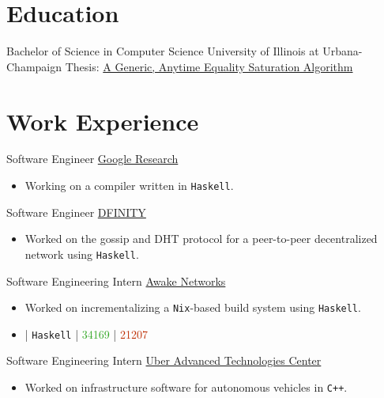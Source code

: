\documentclass[10pt,letterpaper,sans]{moderncv}
\newcommand{\wlink}[2]{\textcolor[HTML]{0020B6}{\href{#1}{#2}}}
\newcommand{\ghlink}[2]{\wlink{https://github.com/#1}{#2}}
\newcommand{\ghrepo}[1]{\ghlink{#1}{\faGithub}}
\newcommand{\ghlang}[1]{\texttt{#1}}
\newcommand{\ghadd}[1]{\textcolor[HTML]{30A622}{{\faPlusCircle} #1}}
\newcommand{\ghrem}[1]{\textcolor[HTML]{BD2C00}{{\faMinusCircle} #1}}
\newcommand{\ghub}[4]{\ghrepo{#2} | \ghlang{#1} | \ghadd{#3} | \ghrem{#4}}
\newcommand{\lang}[1]{\texttt{#1}}
\begin{document}
\makecvtitle{}

\section{Education}
        {Bachelor of Science in Computer Science}
        {University of Illinois at Urbana-Champaign}
        {}{}
        {
Thesis: \wlink{http://taktoa.me/eqsat/Thesis.pdf}{A Generic, Anytime Equality Saturation Algorithm}
}


\section{Work Experience}

        {Software Engineer}
        {\wlink{http://google.ai}{Google Research}}
        {}{}
        {
\begin{itemize}
\item Working on a compiler written in \lang{Haskell}.
\end{itemize}
}

        {Software Engineer}
        {\wlink{http://dfinity.org}{DFINITY}}
        {}{}
        {
\begin{itemize}
\item Worked on the gossip and DHT protocol for a peer-to-peer decentralized network using \lang{Haskell}.
\end{itemize}
}

        {Software Engineering Intern}
        {\wlink{http://www.awakenetworks.com}{Awake Networks}}
        {}{}
        {
\begin{itemize}
\item Worked on incrementalizing a \lang{Nix}-based build system using \lang{Haskell}.
\item \ghub{Haskell}{awakesecurity/language-ninja}{34169}{21207}
\end{itemize}
}

        {Software Engineering Intern}
        {\wlink{https://www.uber.com/info/atc}{Uber Advanced Technologies Center}}
        {}{}
        {
\begin{itemize}
\item Worked on infrastructure software for autonomous vehicles in \lang{C++}.
\end{itemize}
}
\end{document}
